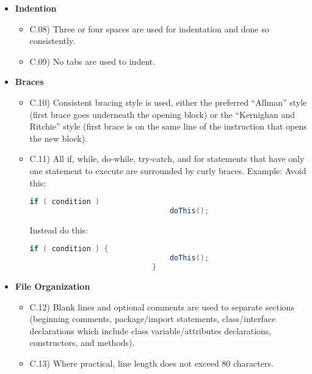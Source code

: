 \documentclass[../../codeInspection.tex]{subfiles}
\begin{document}
\begin{itemize}
\begin{itemize}
					  	\end{itemize}

				\item 	\textbf{Indention}
						\begin{itemize}

							\item C.08)\label{C:08} Three or four spaces are used for indentation and done so consistently.

							\item C.09)\label{C:09} No tabs are used to indent.

						\end{itemize}

				\item 	\textbf{Braces}
						\begin{itemize}

							\item C.10)\label{C:10} Consistent bracing style is used, either the preferred “Allman” style (first brace goes underneath the opening block) or the “Kernighan and Ritchie” style (first brace is on the same line of the instruction that opens the new block).

							\item C.11)\label{C:11} All if, while, do-while, try-catch, and for statements that have only one statement to execute are surrounded by curly braces. Example:
							Avoid this:
							\begin{lstlisting}[language=Java]
							if ( condition )
								doThis();
							\end{lstlisting}
							Instead do this:
							\begin{lstlisting}[language=Java]
							if ( condition ) {
								doThis(); 
							}
							\end{lstlisting}

						\end{itemize}

				\item 	\textbf{File Organization}
						\begin{itemize}

							\item C.12)\label{C:12} Blank lines and optional comments are used to separate sections (beginning comments, package/import statements, class/interface declarations which include class variable/attributes declarations, constructors, and methods).

							\item C.13)\label{C:13} Where practical, line length does not exceed 80 characters.


\end{itemize}
\end{itemize}
\end{document}
